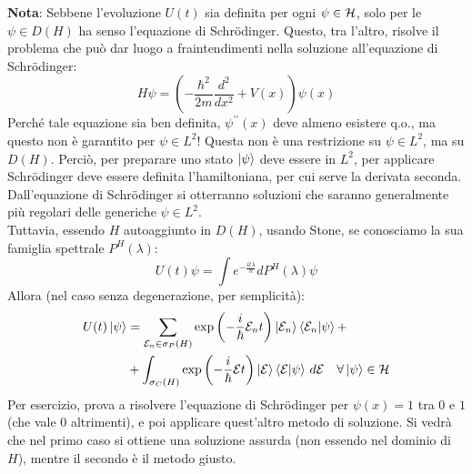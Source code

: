 \documentclass[../../FisicaTeorica.tex]{subfiles}
\begin{document}
\textbf{Nota}: Sebbene l'evoluzione $U(t)$ sia definita per ogni $\psi \in \mathcal{H}$, solo per le $\psi \in D(H)$ ha senso l'equazione di Schrödinger. Questo, tra l'altro, risolve il problema che può dar luogo a fraintendimenti nella soluzione all'equazione di Schrödinger:
\[
	H\psi =\left(-\frac{\hbar^2}{2m}\frac{d^2}{dx^2}+V\left(x\right)\right)\psi \left(x\right)
\]
	Perché tale equazione sia ben definita, $\psi^{\prime\prime}(x)$ deve almeno esistere q.o., ma questo non è garantito per $\psi \in L^2$! Questa non è una restrizione su $\psi \in L^2$, ma su $D(H)$. Perciò, per preparare uno stato $\ket{\psi}$ deve essere in $L^2$, per applicare Schrödinger deve essere definita l'hamiltoniana, per cui serve la derivata seconda. Dall'equazione di Schrödinger si otterranno soluzioni che saranno generalmente più regolari delle generiche $\psi \in L^2$.\\
	Tuttavia, essendo $H$ autoaggiunto in $D\left(H\right)$, usando Stone, se conosciamo la sua famiglia spettrale $P^H\left(\lambda\right)$:
	\[
	U\left(t\right)\psi =\int e^{-\frac{it\lambda}{\hbar}}dP^H\left(\lambda\right)\psi 
	\]
	Allora (nel caso senza degenerazione, per semplicità):
	\begin{align}
	U(t)\ket{\psi} &= \sum_{\mathcal{E}_n \in \sigma_P(H)} \exp\left (-\frac{i}{\hbar}\mathcal{E}_n t\right) \ket{\mathcal{E}_n}\braket{\mathcal{E}_n |\psi} +\\
	&+ \nonumber
	\int_{\sigma_C(H)} \exp\left(-\frac{i}{\hbar}\mathcal{E}t\right ) \ket{\mathcal{E}}\braket{\mathcal{E}|\psi}\, d\mathcal{E} \quad \forall \ket{\psi}\in \mathcal{H}
	\label{eqn:evoluzionetemporale_nodeg}
	\end{align}
Per esercizio, prova a risolvere l'equazione di Schrödinger per $\psi \left(x\right)=1$ tra $0$ e $1$ (che vale $0$ altrimenti), e poi applicare quest'altro metodo di soluzione. Si vedrà che nel primo caso si ottiene una soluzione assurda (non essendo nel dominio di $H$), mentre il secondo è il metodo giusto.
\end{document}
